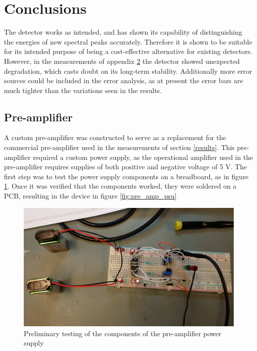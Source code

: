 \documentclass[a4paper]{article}
\begin{document}
\clearpage
\section{Conclusions}
\label{conclusions}

The detector works as intended, and has shown its capability of distinguishing the energies of new spectral peaks accurately.
Therefore it is shown to be suitable for its intended purpose of being a cost-effective alternative for existing detectors.
However, in the measurements of appendix \ref{pre_amp} the detector showed unexpected degradation, which casts doubt on its long-term stability.
Additionally more error sources could be included in the error analysis, as at present the error bars are much tighter than the variations seen in the results.


\clearpage
\begin{appendices}

\section{Pre-amplifier}
\label{pre_amp}
A custom pre-amplifier was constructed to serve as a replacement for the commercial pre-amplifier used in the measurements of section \ref{results}.
This pre-amplifier required a custom power supply, as the operational amplifier used in the pre-amplifier requires supplies of both positive and negative voltage of 5 V.
The first step was to test the power supply components on a breadboard, as in figure \ref{fig:pre_amp_psu_testing}.
Once it was verified that the components worked, they were soldered on a PCB, resulting in the device in figure \ref{fig:pre_amp_psu}

\begin{figure}[ht!]
\centering
\includegraphics[width=\textwidth]{fig/IMG_20201005_104331-cropped.jpg}
\caption{Preliminary testing of the components of the pre-amplifier power supply}
\label{fig:pre_amp_psu_testing}
\end{figure}


\end{appendices}
\end{document}
